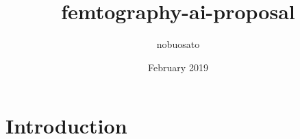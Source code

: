 \documentclass{article}
\title{femtography-ai-proposal}
\author{nobuosato }
\date{February 2019}
\begin{document}
\maketitle

\section{Introduction}
\end{document}
